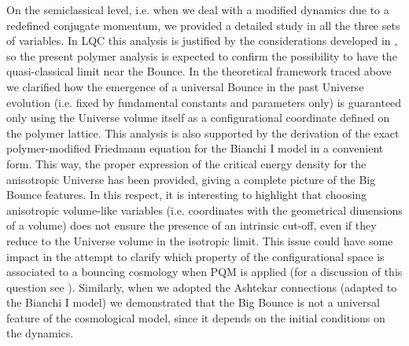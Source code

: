 \documentclass[aps,prd,twocolumn,nofootinbib,superscriptaddress]{revtex4-2}
\begin{document}
On the semiclassical level, i.e. when we deal with a modified dynamics
due to a redefined conjugate momentum, we provided a detailed study in all the three
sets of variables. In LQC this analysis is justified by the considerations developed in \cite{Rovelli2,B1,B2}, so the present polymer analysis is expected to confirm the possibility to have the quasi-classical limit near the Bounce. In the theoretical framework traced above we clarified how the emergence
of a universal Bounce in the past Universe evolution (i.e. fixed by fundamental constants and parameters only) is guaranteed only using the Universe volume itself as a configurational coordinate defined on the polymer lattice. This analysis is also supported by the derivation of the exact polymer-modified Friedmann equation for the Bianchi I model in a convenient form. This way, the proper expression of the critical energy density for the anisotropic Universe has been provided, giving a complete picture of the Big Bounce features. In this respect, it is interesting to highlight that choosing anisotropic volume-like variables (i.e. coordinates with the geometrical dimensions of a volume) does not ensure the presence of an intrinsic cut-off, even if they reduce to the Universe volume in the isotropic limit.
This issue could have some impact in the attempt to clarify which
property of the configurational space
is associated to a bouncing cosmology when PQM
is applied (for a discussion of this
question see \cite{EBianchiIX, EFG}). Similarly, when we adopted the Ashtekar connections (adapted to the Bianchi
I model) we demonstrated that the
Big Bounce is not a universal feature of the cosmological model, since it depends on the initial conditions on the dynamics.
\end{document}
